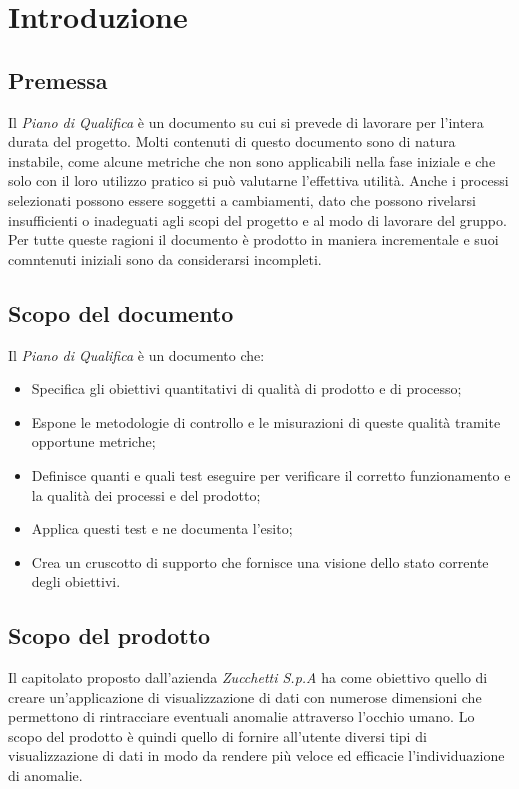 \chapter{Introduzione}
\section{Premessa}

Il \textit{Piano di Qualifica} è un documento su cui si prevede di lavorare per l'intera durata del progetto. Molti contenuti di questo documento sono di natura instabile, come alcune metriche che non sono applicabili nella fase iniziale e che solo con il loro utilizzo pratico si può valutarne l'effettiva utilità. Anche i processi selezionati possono essere soggetti a cambiamenti, dato che possono rivelarsi insufficienti o inadeguati agli scopi del progetto e al modo di lavorare del gruppo.
Per tutte queste ragioni il documento è prodotto in maniera incrementale e suoi comntenuti iniziali sono da considerarsi incompleti.

\section{Scopo del documento}
Il \textit{Piano di Qualifica} è un documento che:
\begin{itemize}
    \item Specifica gli obiettivi
    quantitativi di qualità di prodotto e di processo;
    \item Espone le
    metodologie di controllo e le misurazioni di queste qualità tramite
    opportune metriche;
    \item Definisce quanti e quali test eseguire per verificare il corretto funzionamento
    e la qualità dei processi e del prodotto;
    \item Applica questi test e ne documenta l'esito;
    \item Crea un cruscotto di supporto che fornisce
    una visione dello stato corrente degli obiettivi.
\end{itemize}

\section{Scopo del prodotto}
Il capitolato proposto dall'azienda \textit{Zucchetti S.p.A} ha come obiettivo
quello di creare un'applicazione di visualizzazione di dati con numerose dimensioni
che permettono di rintracciare eventuali anomalie attraverso l'occhio umano. Lo
scopo del prodotto è quindi quello di fornire all'utente diversi tipi di
visualizzazione di dati in modo da rendere più veloce ed efficacie l'individuazione
di anomalie.

